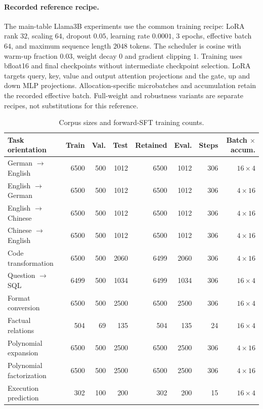 \paragraph{Recorded reference recipe.}
The main-table Llama3B experiments use the common training recipe: LoRA rank $32$, scaling $64$, dropout $0.05$, learning rate $0.0001$, $3$ epochs, effective batch $64$, and maximum sequence length $2048$ tokens. The scheduler is cosine with warm-up fraction $0.03$, weight decay $0$ and gradient clipping $1$. Training uses bfloat16 and final checkpoints without intermediate checkpoint selection. LoRA targets query, key, value and output attention projections and the gate, up and down MLP projections. Allocation-specific microbatches and accumulation retain the recorded effective batch. Full-weight and robustness variants are separate recipes, not substitutions for this reference.
\begin{table}[t]
\centering\footnotesize
\setlength{\tabcolsep}{4pt}
\begin{tabular}{lrrrrrrr}
\toprule
Task orientation & Train & Val. & Test & Retained & Eval. & Steps & Batch $\times$ accum. \\
\midrule
German $\to$ English & 6500 & 500 & 1012 & 6500 & 1012 & 306 & $16\times4$ \\
English $\to$ German & 6500 & 500 & 1012 & 6500 & 1012 & 306 & $4\times16$ \\
English $\to$ Chinese & 6500 & 500 & 1012 & 6500 & 1012 & 306 & $4\times16$ \\
Chinese $\to$ English & 6500 & 500 & 1012 & 6500 & 1012 & 306 & $4\times16$ \\
Code transformation & 6500 & 500 & 2060 & 6499 & 2060 & 306 & $4\times16$ \\
Question $\to$ SQL & 6499 & 500 & 1034 & 6499 & 1034 & 306 & $16\times4$ \\
Format conversion & 6500 & 500 & 2500 & 6500 & 2500 & 306 & $16\times4$ \\
Factual relations & 504 & 69 & 135 & 504 & 135 & 24 & $16\times4$ \\
Polynomial expansion & 6500 & 500 & 2500 & 6500 & 2500 & 306 & $4\times16$ \\
Polynomial factorization & 6500 & 500 & 2500 & 6500 & 2500 & 306 & $4\times16$ \\
Execution prediction & 302 & 100 & 200 & 302 & 200 & 15 & $16\times4$ \\
\bottomrule
\end{tabular}
\caption{Corpus sizes and forward-SFT training counts.}
\label{tab:reference-methods}
\end{table}
